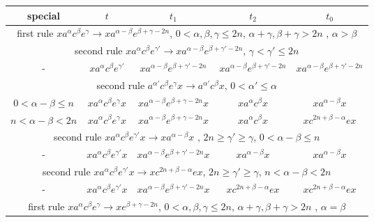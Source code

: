 \documentclass{article}
\theoremstyle{definition}
\begin{document}
\begin{center}
\begin{tabular}{|c|c|c|c|c|}
\hline
special & $t$ & $t_1$ & $t_2$ & $t_0$ \\
\hline
\hline
\multicolumn{5}{|c|}{first rule $x a^\alpha c^\beta e^\gamma \rightarrow x a^{\alpha - \beta} e^{\beta+\gamma-2n}$, $0< \alpha,\beta,\gamma  \le 2n$, $\alpha+\gamma, \beta+\gamma> 2n$ , $\alpha > \beta$}\\
\hline
\hline
\multicolumn{5}{|c|}{second rule $x a^\alpha c^\beta e^{\gamma'} \rightarrow x a^{\alpha - \beta} e^{\beta+\gamma'-2n}$, $\gamma < \gamma' \le 2n$}\\
\hline
- & $x a^\alpha c^\beta e^{\gamma'} $ & $x a^{\alpha - \beta} e^{\beta+\gamma'-2n}$ & $x a^{\alpha - \beta} e^{\beta+\gamma'-2n}$ & $x a^{\alpha - \beta} e^{\beta+\gamma'-2n}$\\
\hline
\multicolumn{5}{|c|}{second rule $a^{\alpha'} c^\beta e^\gamma x  \rightarrow a^{\alpha'} c^\beta x $, $0<\alpha' \le \alpha$}\\
\hline
$0< \alpha -\beta \le n$&  $ x a^\alpha c^{\beta}  e^{\gamma}  x$ &  $ x a^{\alpha - \beta} e^{\beta+\gamma-2n} x$ &  $   x a^\alpha  c^\beta x  $ & $ x a^{\alpha-\beta} x  $\\
\hline
$n< \alpha -\beta < 2n$&  $ x a^\alpha c^{\beta}  e^{\gamma}  x$ &  $ x a^{\alpha - \beta} e^{\beta+\gamma-2n} x$ &  $   x a^\alpha  c^\beta x  $ & $ x c^{2n+\beta - \alpha} e x  $\\
\hline
\multicolumn{5}{|c|}{second rule $x a^{\alpha} c^\beta e^{\gamma'} x  \rightarrow x a^{\alpha -\beta}x $ , $2n\ge \gamma' \ge \gamma$,  $0< \alpha -\beta \le n$}\\
\hline
- &  $ x a^\alpha c^{\beta}  e^{\gamma'}  x$ &  $ x a^{\alpha - \beta} e^{\beta+\gamma'-2n}   x$ &  $   x a^{\alpha-\beta} x  $ & $ x a^{\alpha-\beta} x  $\\
\hline
\multicolumn{5}{|c|}{second rule $x a^{\alpha} c^\beta e^{\gamma'} x  \rightarrow x c^{2n+\beta - \alpha} e  x$, $2n\ge \gamma' \ge \gamma$,  $n< \alpha -\beta < 2n$}\\
\hline
- &  $ x a^\alpha c^{\beta}  e^{\gamma'}  x$ &  $ x a^{\alpha - \beta} e^{\beta+\gamma'-2n}   x$ &  $   x c^{2n+\beta - \alpha} e x  $ & $ x c^{2n+\beta - \alpha} e x $\\
\hline
\hline
\multicolumn{5}{|c|}{first rule $x a^\alpha c^\beta e^\gamma \rightarrow x e^{\beta+\gamma-2n}$, $0< \alpha,\beta,\gamma  \le 2n$, $\alpha+\gamma, \beta+\gamma> 2n$ , $\alpha = \beta$}\\

\end{tabular}
\end{center}
\end{document}
